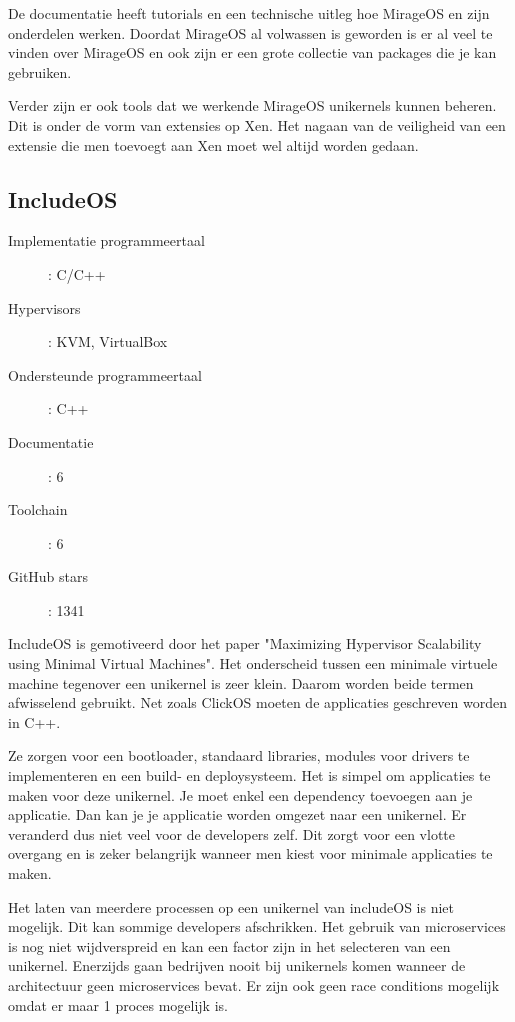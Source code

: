 \documentclass[pdftex,a4paper,12pt,twoside]{report}
\begin{document}
De documentatie heeft tutorials en een technische uitleg hoe MirageOS en zijn onderdelen werken. Doordat MirageOS al volwassen is geworden is er al veel te vinden over MirageOS en ook zijn er een grote collectie van packages die je kan gebruiken.

Verder zijn er ook tools dat we werkende MirageOS unikernels kunnen beheren. Dit is onder de vorm van extensies op Xen. Het nagaan van de veiligheid van een extensie die men toevoegt aan Xen moet wel altijd worden gedaan.

\subsection{IncludeOS}
\begin{description}
  \item [Implementatie programmeertaal]: C/C++
  \item [Hypervisors]: KVM, VirtualBox
  \item [Ondersteunde programmeertaal]: C++
  \item [Documentatie]: 6
  \item [Toolchain]: 6
  \item [GitHub stars]: 1341
\end{description}

IncludeOS is gemotiveerd door het paper "Maximizing Hypervisor Scalability using Minimal Virtual Machines". Het onderscheid tussen een minimale virtuele machine tegenover een unikernel is zeer klein. Daarom worden beide termen afwisselend gebruikt. Net zoals ClickOS moeten de applicaties geschreven worden in C++.

Ze zorgen voor een bootloader, standaard libraries, modules voor drivers te implementeren en een build- en deploysysteem. Het is simpel om applicaties te maken voor deze unikernel. Je moet enkel een dependency toevoegen aan je applicatie. Dan kan je je applicatie worden omgezet naar een unikernel. Er veranderd dus niet veel voor de developers zelf. Dit zorgt voor een vlotte overgang en is zeker belangrijk wanneer men kiest voor minimale applicaties te maken.

Het laten van meerdere processen op een unikernel van includeOS is niet mogelijk. Dit kan sommige developers afschrikken. Het gebruik van microservices is nog niet wijdverspreid en kan een factor zijn in het selecteren van een unikernel. Enerzijds gaan bedrijven nooit bij unikernels komen wanneer de architectuur geen microservices bevat. Er zijn ook geen race conditions mogelijk omdat er maar 1 proces mogelijk is.
\end{document}
